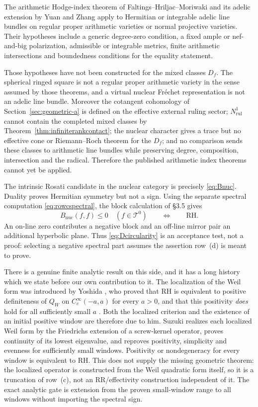 \documentclass[11pt]{amsart}
\theoremstyle{definition}
\theoremstyle{remark}
\newcommand{\RH}{\mathrm{RH}}
\begin{document}
The arithmetic Hodge-index theorem of Faltings--Hriljac--Moriwaki and its
adelic extension by Yuan and Zhang \cite[Theorems~1.1 and~1.3]{YuanZhang}
apply to Hermitian or integrable adelic line bundles on regular proper
arithmetic varieties or normal projective varieties.  Their hypotheses
include a generic degree-zero condition, a fixed ample or nef-and-big
polarization, admissible or integrable metrics, finite arithmetic
intersections and boundedness conditions for the equality statement.

Those hypotheses have not been constructed for the mixed classes $D_f$.
The spherical ringed square is not a regular proper arithmetic variety in
the sense assumed by those theorems, and a virtual nuclear Fr\'echet
representation is not an adelic line bundle.  Moreover the cotangent
cohomology of Section~\ref{sec:geometric-a} is defined on the effective
external ruling sector; $N^1_{\mathrm{rul}}$ cannot contain the completed
mixed classes by Theorem~\ref{thm:infiniterankcontact}; the nuclear character
gives a trace but no effective cone or Riemann--Roch theorem for the $D_f$;
and no comparison sends these classes to arithmetic line bundles while
preserving degree, composition, intersection and the radical.
Therefore the published arithmetic index theorems cannot yet be applied.

The intrinsic Rosati candidate in the nuclear category is precisely
\eqref{eq:Bnuc}.  Duality proves Hermitian symmetry but not a sign.  Using
the separate spectral computation \eqref{eq:rowcspectral}, the block
calculation of \S3.5 gives
\begin{equation}\label{eq:Dcircularity}
 B_{\mathrm{nuc}}(f,f)\le0\quad(f\in\mathcal T^0)
 \qquad\Longleftrightarrow\qquad \RH.
\end{equation}
An on-line zero contributes a negative block and an off-line mirror pair an
additional hyperbolic plane.  Thus \eqref{eq:Dcircularity} is an acceptance
test, not a proof: selecting a negative spectral part assumes the assertion
row~(d) is meant to prove.

There is a genuine finite analytic result on this side, and it has a long
history which we state before our own contribution to it.  The localization
of the Weil form was introduced by Yoshida \cite{Yoshida1992}, who proved
that $\RH$ is equivalent to positive definiteness of $Q_W$ on
$C_c^\infty(-a,a)$ for every $a>0$, and that this positivity \emph{does}
hold for all sufficiently small $a$ \cite[Lemma~2]{Yoshida1992}.  Both the
localized criterion and the existence of an initial positive window are
therefore due to him.  Suzuki
\cite[Theorems~1.1--1.4]{SuzukiScrew} realizes each localized Weil form by
the Friedrichs extension of a screw-kernel operator, proves continuity of
its lowest eigenvalue, and reproves positivity, simplicity and evenness for
sufficiently small windows.  Positivity or nondegeneracy for every window is
equivalent to $\RH$.  This does not supply the missing geometric theorem:
the localized operator is constructed from the Weil quadratic form itself,
so it is a truncation of row~(c), not an RR/effectivity construction
independent of it.  The exact analytic gate is extension from the proven
small-window range to all windows without importing the spectral sign.
\end{document}
